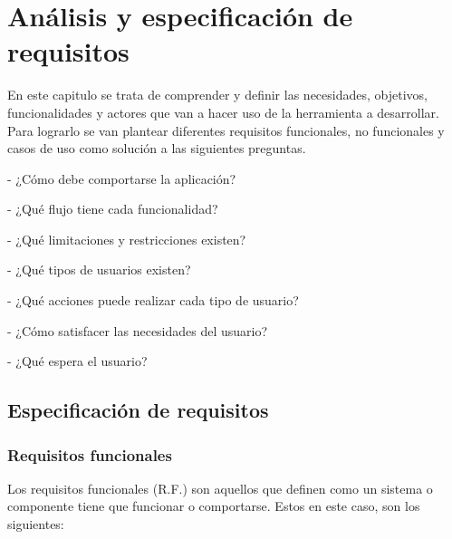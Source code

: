 \chapter{Análisis y especificación de requisitos}

En este capitulo se trata de comprender y definir las necesidades, objetivos, funcionalidades y actores que van a hacer uso de la herramienta a desarrollar. Para lograrlo se van plantear diferentes requisitos funcionales, no funcionales y casos de uso como solución a las siguientes preguntas.

- ¿Cómo debe comportarse la aplicación?

- ¿Qué flujo tiene cada funcionalidad?

- ¿Qué limitaciones y restricciones existen?

- ¿Qué tipos de usuarios existen?

- ¿Qué acciones puede realizar cada tipo de usuario?

- ¿Cómo satisfacer las necesidades del 
usuario?

- ¿Qué espera el usuario?




\section{Especificación de requisitos}

\subsection{Requisitos funcionales}

Los requisitos funcionales (R.F.) son aquellos que definen como un sistema o componente tiene que funcionar o comportarse. Estos en este caso,
son los siguientes:

